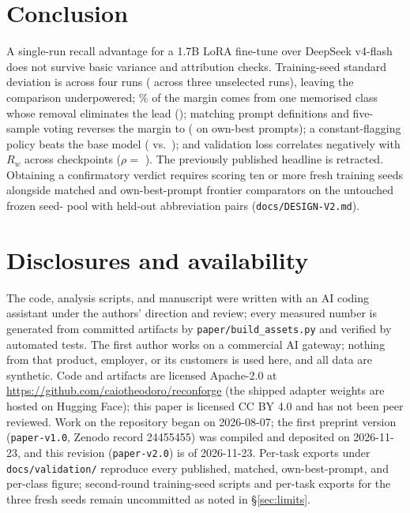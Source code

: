 \documentclass[11pt]{article}
\begin{document}
\section{Conclusion}
\label{sec:conclusion}

A single-run \margin{} recall advantage for a 1.7B LoRA fine-tune over DeepSeek v4-flash does not survive basic variance and attribution checks. Training-seed standard deviation is \rwSD{} across four runs (\rwFreshSD{} across three unselected runs), leaving the comparison underpowered; \partialShare{}\% of the margin comes from one memorised class whose removal eliminates the lead (\noPmPub{}); matching prompt definitions and five-sample voting reverses the margin to \matMargin{} (\bestPrompt{} on own-best prompts); a constant-flagging policy beats the base model (\floorRw{} vs.\ \rwBase{}); and validation loss correlates negatively with $R_w$ across checkpoints ($\rho = $ \ckptRho{}). The previously published headline is retracted. Obtaining a confirmatory verdict requires scoring ten or more fresh training seeds alongside matched and own-best-prompt frontier comparators on the untouched frozen seed-\frozenSeed{} pool with held-out abbreviation pairs (\texttt{docs/DESIGN-V2.md}).

\section*{Disclosures and availability}

The code, analysis scripts, and manuscript were written with an AI coding assistant under the authors' direction and review; every measured number is generated from committed artifacts by \texttt{paper/build\_assets.py} and verified by automated tests. The first author works on a commercial AI gateway; nothing from that product, employer, or its customers is used here, and all data are synthetic. Code and artifacts are licensed Apache-2.0 at \url{https://github.com/caiotheodoro/reconforge} (the shipped adapter weights are hosted on Hugging Face); this paper is licensed CC BY 4.0 and has not been peer reviewed. Work on the repository began on 2026-08-07; the first preprint version (\texttt{paper-v1.0}, Zenodo record 24455455) was compiled and deposited on 2026-11-23, and this revision (\texttt{paper-v2.0}) is of 2026-11-23. Per-task exports under \texttt{docs/validation/} reproduce every published, matched, own-best-prompt, and per-class figure; second-round training-seed scripts and per-task exports for the three fresh seeds remain uncommitted as noted in \S\ref{sec:limits}.
\end{document}
